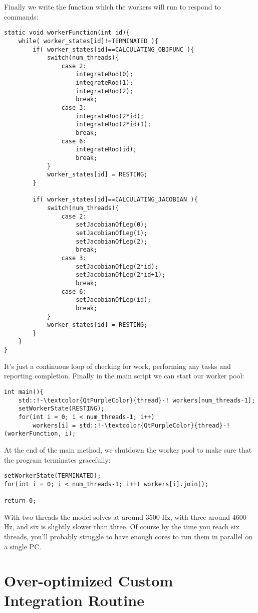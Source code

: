 \documentclass[12pt]{article}
\begin{document}
Finally we write the function which the workers will run to respond to commands:
\begin{lstlisting}
static void workerFunction(int id){
    while( worker_states[id]!=TERMINATED ){
        if( worker_states[id]==CALCULATING_OBJFUNC ){
            switch(num_threads){
                case 2:
                    integrateRod(0);
                    integrateRod(1);
                    integrateRod(2);
                    break;
                case 3:
                    integrateRod(2*id);
                    integrateRod(2*id+1);
                    break;
                case 6:
                    integrateRod(id);
                    break;
            }
            worker_states[id] = RESTING;
        }

        if( worker_states[id]==CALCULATING_JACOBIAN ){
            switch(num_threads){
                case 2:
                    setJacobianOfLeg(0);
                    setJacobianOfLeg(1);
                    setJacobianOfLeg(2);
                    break;
                case 3:
                    setJacobianOfLeg(2*id);
                    setJacobianOfLeg(2*id+1);
                    break;
                case 6:
                    setJacobianOfLeg(id);
                    break;
            }
            worker_states[id] = RESTING;
        }
    }
}
\end{lstlisting}
It's just a continuous loop of checking for work, performing any tasks and reporting completion. Finally in the main script we can start our worker pool:
\begin{lstlisting}
int main(){
    std::!-\textcolor{QtPurpleColor}{thread}-! workers[num_threads-1];
    setWorkerState(RESTING);
    for(int i = 0; i < num_threads-1; i++)
        workers[i] = std::!-\textcolor{QtPurpleColor}{thread}-!(workerFunction, i);
\end{lstlisting}
At the end of the main method, we shutdown the worker pool to make sure that the program terminates gracefully:
\begin{lstlisting}
setWorkerState(TERMINATED);
for(int i = 0; i < num_threads-1; i++) workers[i].join();

return 0;
\end{lstlisting}
With two threads the model solves at around 3500 Hz, with three around 4600 Hz, and six is slightly slower than three. Of course by the time you reach six threads, you'll probably struggle to have enough cores to run them in parallel on a single PC.

\section{Over-optimized Custom Integration Routine}
\end{document}
